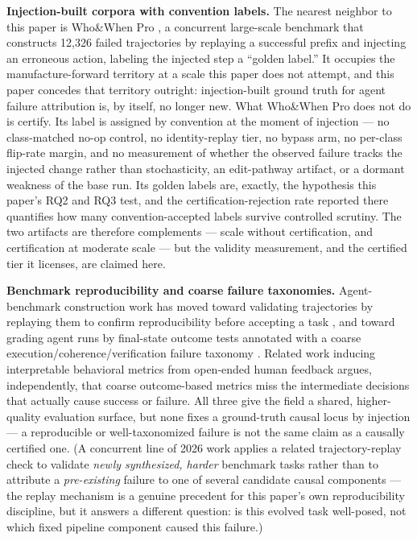 \documentclass[11pt]{article}
\begin{document}
\textbf{Injection-built corpora with convention labels.} The nearest neighbor to this paper is Who\&When Pro \citep{WhoAndWhenPro2026}, a concurrent large-scale benchmark that constructs 12{,}326 failed trajectories by replaying a successful prefix and injecting an erroneous action, labeling the injected step a ``golden label.'' It occupies the manufacture-forward territory at a scale this paper does not attempt, and this paper concedes that territory outright: injection-built ground truth for agent failure attribution is, by itself, no longer new. What Who\&When Pro does not do is certify. Its label is assigned by convention at the moment of injection --- no class-matched no-op control, no identity-replay tier, no bypass arm, no per-class flip-rate margin, and no measurement of whether the observed failure tracks the injected change rather than stochasticity, an edit-pathway artifact, or a dormant weakness of the base run. Its golden labels are, exactly, the hypothesis this paper's RQ2 and RQ3 test, and the certification-rejection rate reported there quantifies how many convention-accepted labels survive controlled scrutiny. The two artifacts are therefore complements --- scale without certification, and certification at moderate scale --- but the validity measurement, and the certified tier it licenses, are claimed here.

\textbf{Benchmark reproducibility and coarse failure taxonomies.} Agent-benchmark construction work has moved toward validating trajectories by replaying them to confirm reproducibility before accepting a task \citep{SelfEvolveBench2025}, and toward grading agent runs by final-state outcome tests annotated with a coarse execution/coherence/verification failure taxonomy \citep{TerminalBench2025}. Related work inducing interpretable behavioral metrics from open-ended human feedback \citep{AutoLibra2025} argues, independently, that coarse outcome-based metrics miss the intermediate decisions that actually cause success or failure. All three give the field a shared, higher-quality evaluation surface, but none fixes a ground-truth causal locus by injection --- a reproducible or well-taxonomized failure is not the same claim as a causally certified one. (A concurrent line of 2026 work applies a related trajectory-replay check to validate \emph{newly synthesized, harder} benchmark tasks rather than to attribute a \emph{pre-existing} failure to one of several candidate causal components \citep{SelfEvolveBench2025} --- the replay mechanism is a genuine precedent for this paper's own reproducibility discipline, but it answers a different question: is this evolved task well-posed, not which fixed pipeline component caused this failure.)
\end{document}
